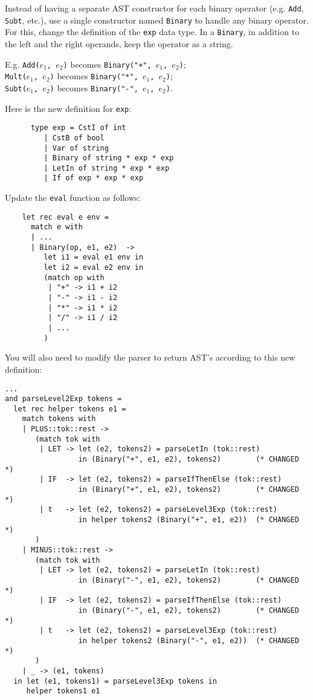 \documentclass[addpoints]{exam}
\begin{document}
\begin{questions}
  \question
  Instead of having a separate AST constructor for
  each binary operator
  (e.g. \texttt{Add}, \texttt{Subt}, etc.),
  use a single constructor named \texttt{Binary}
  to handle any binary operator.
  For this, change the definition of the
  \texttt{exp} data type.
  In a \texttt{Binary},
  in addition to the left and the right operands,
  keep the operator as a string.
  
  E.g. \texttt{Add($e_1$, $e_2$)} becomes
  \texttt{Binary("+", $e_1$, $e_2$)};\\
  \texttt{Mult($e_1$, $e_2$)} becomes
  \texttt{Binary("*", $e_1$, $e_2$)};\\
  \texttt{Subt($e_1$, $e_2$)} becomes
  \texttt{Binary("-", $e_1$, $e_2$)}.
  
  \begin{solution}%
    Here is the new definition for \texttt{exp}:
    \begin{verbatim}
      type exp = CstI of int
         | CstB of bool
         | Var of string
         | Binary of string * exp * exp
         | LetIn of string * exp * exp
         | If of exp * exp * exp
    \end{verbatim}

    Update the \texttt{eval} function as follows:

    \begin{verbatim}
    let rec eval e env =
      match e with
      | ...
      | Binary(op, e1, e2)  ->
         let i1 = eval e1 env in
         let i2 = eval e2 env in
         (match op with
          | "+" -> i1 + i2
          | "-" -> i1 - i2
          | "*" -> i1 * i2
          | "/" -> i1 / i2
          | ...
         )
    \end{verbatim}

    You will also need to modify the parser
    to return AST's according to this new definition:

    {\small
    \begin{verbatim}
...
and parseLevel2Exp tokens =
  let rec helper tokens e1 =
    match tokens with
    | PLUS::tok::rest ->
       (match tok with
        | LET -> let (e2, tokens2) = parseLetIn (tok::rest)
                 in (Binary("+", e1, e2), tokens2)        (* CHANGED *)
        | IF  -> let (e2, tokens2) = parseIfThenElse (tok::rest)
                 in (Binary("+", e1, e2), tokens2)        (* CHANGED *)
        | t   -> let (e2, tokens2) = parseLevel3Exp (tok::rest)
                 in helper tokens2 (Binary("+", e1, e2))  (* CHANGED *)
       )
    | MINUS::tok::rest ->
       (match tok with
        | LET -> let (e2, tokens2) = parseLetIn (tok::rest)
                 in (Binary("-", e1, e2), tokens2)        (* CHANGED *)
        | IF  -> let (e2, tokens2) = parseIfThenElse (tok::rest)
                 in (Binary("-", e1, e2), tokens2)        (* CHANGED *)
        | t   -> let (e2, tokens2) = parseLevel3Exp (tok::rest)
                 in helper tokens2 (Binary("-", e1, e2))  (* CHANGED *)
       )
    | _ -> (e1, tokens)
  in let (e1, tokens1) = parseLevel3Exp tokens in
     helper tokens1 e1


\end{verbatim}}
\end{solution}
\end{questions}
\end{document}
